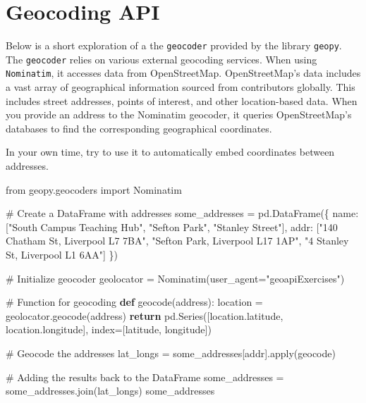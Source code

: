 \documentclass[
  letterpaper,
  DIV=11,
  numbers=noendperiod]{scrreprt}
\newenvironment{Shaded}{\begin{snugshade}}{\end{snugshade}}
\newcommand{\BuiltInTok}[1]{\textcolor[rgb]{0.00,0.23,0.31}{#1}}
\newcommand{\CommentTok}[1]{\textcolor[rgb]{0.37,0.37,0.37}{#1}}
\newcommand{\ControlFlowTok}[1]{\textcolor[rgb]{0.00,0.23,0.31}{\textbf{#1}}}
\newcommand{\ImportTok}[1]{\textcolor[rgb]{0.00,0.46,0.62}{#1}}
\newcommand{\KeywordTok}[1]{\textcolor[rgb]{0.00,0.23,0.31}{\textbf{#1}}}
\newcommand{\NormalTok}[1]{\textcolor[rgb]{0.00,0.23,0.31}{#1}}
\newcommand{\OperatorTok}[1]{\textcolor[rgb]{0.37,0.37,0.37}{#1}}
\newcommand{\StringTok}[1]{\textcolor[rgb]{0.13,0.47,0.30}{#1}}
\begin{document}
\section{Geocoding API}\label{geocoding-api}

Below is a short exploration of a the \texttt{geocoder} provided by the
library \texttt{geopy}. The \texttt{geocoder} relies on various external
geocoding services. When using \texttt{Nominatim}, it accesses data from
OpenStreetMap. OpenStreetMap's data includes a vast array of
geographical information sourced from contributors globally. This
includes street addresses, points of interest, and other location-based
data. When you provide an address to the Nominatim geocoder, it queries
OpenStreetMap's databases to find the corresponding geographical
coordinates.

In your own time, try to use it to automatically embed coordinates
between addresses.

\begin{Shaded}
\begin{Highlighting}[]
\ImportTok{from}\NormalTok{ geopy.geocoders }\ImportTok{import}\NormalTok{ Nominatim}

\CommentTok{\# Create a DataFrame with addresses}
\NormalTok{some\_addresses }\OperatorTok{=}\NormalTok{ pd.DataFrame(\{}
    \StringTok{\textquotesingle{}name\textquotesingle{}}\NormalTok{: [}\StringTok{"South Campus Teaching Hub"}\NormalTok{, }\StringTok{"Sefton Park"}\NormalTok{, }\StringTok{"Stanley Street"}\NormalTok{],}
    \StringTok{\textquotesingle{}addr\textquotesingle{}}\NormalTok{: [}\StringTok{"140 Chatham St, Liverpool L7 7BA"}\NormalTok{, }\StringTok{"Sefton Park, Liverpool L17 1AP"}\NormalTok{, }\StringTok{"4 Stanley St, Liverpool L1 6AA"}\NormalTok{]}
\NormalTok{\})}

\CommentTok{\# Initialize geocoder}
\NormalTok{geolocator }\OperatorTok{=}\NormalTok{ Nominatim(user\_agent}\OperatorTok{=}\StringTok{"geoapiExercises"}\NormalTok{)}

\CommentTok{\# Function for geocoding}
\KeywordTok{def}\NormalTok{ geocode(address):}
\NormalTok{    location }\OperatorTok{=}\NormalTok{ geolocator.geocode(address)}
    \ControlFlowTok{return}\NormalTok{ pd.Series([location.latitude, location.longitude], index}\OperatorTok{=}\NormalTok{[}\StringTok{\textquotesingle{}latitude\textquotesingle{}}\NormalTok{, }\StringTok{\textquotesingle{}longitude\textquotesingle{}}\NormalTok{])}

\CommentTok{\# Geocode the addresses}
\NormalTok{lat\_longs }\OperatorTok{=}\NormalTok{ some\_addresses[}\StringTok{\textquotesingle{}addr\textquotesingle{}}\NormalTok{].}\BuiltInTok{apply}\NormalTok{(geocode)}

\CommentTok{\# Adding the results back to the DataFrame}
\NormalTok{some\_addresses }\OperatorTok{=}\NormalTok{ some\_addresses.join(lat\_longs)}
\NormalTok{some\_addresses}
\end{Highlighting}
\end{Shaded}
\end{document}
